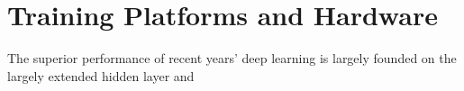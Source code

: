 \section{Training Platforms and Hardware}
The superior performance of recent years' deep learning is largely founded on the largely extended hidden layer  and  